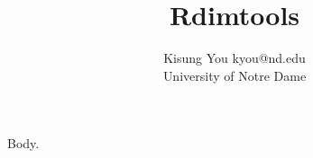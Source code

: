 \documentclass{article}
\title{Rdimtools}
\author{\name Kisung You \email kyou@nd.edu \\
	\addr University of Notre Dame}
\begin{document}
\maketitle
Body.
\end{document}
